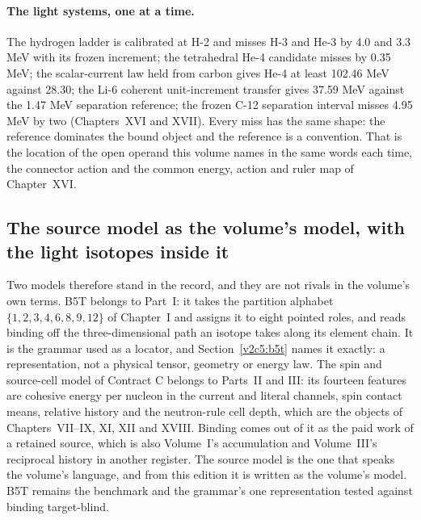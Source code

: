 \paragraph{The light systems, one at a time.} The hydrogen ladder is calibrated at H-2 and misses H-3 and He-3 by 4.0 and 3.3 MeV with its frozen increment; the tetrahedral He-4 candidate misses by 0.35 MeV; the scalar-current law held from carbon gives He-4 at least 102.46 MeV against 28.30; the Li-6 coherent unit-increment transfer gives 37.59 MeV against the 1.47 MeV separation reference; the frozen C-12 separation interval misses 4.95 MeV by two (Chapters~XVI and XVII). Every miss has the same shape: the reference dominates the bound object and the reference is a convention. That is the location of the open operand this volume names in the same words each time, the connector action and the common energy, action and ruler map of Chapter~XVI.

\subsection{The source model as the volume's model, with the light isotopes inside it}
\label{v2c5:sourcemodel}

Two models therefore stand in the record, and they are not rivals in the volume's own terms. B5T belongs to Part~I: it takes the partition alphabet $\{1,2,3,4,6,8,9,12\}$ of Chapter~I and assigns it to eight pointed roles, and reads binding off the three-dimensional path an isotope takes along its element chain. It is the grammar used as a locator, and Section~\ref{v2c5:b5t} names it exactly: a representation, not a physical tensor, geometry or energy law. The spin and source-cell model of Contract C belongs to Parts~II and III: its fourteen features are cohesive energy per nucleon in the current and literal channels, spin contact means, relative history and the neutron-rule cell depth, which are the objects of Chapters~VII--IX, XI, XII and XVIII. Binding comes out of it as the paid work of a retained source, which is also Volume~I's accumulation and Volume~III's reciprocal history in another register. The source model is the one that speaks the volume's language, and from this edition it is written as the volume's model. B5T remains the benchmark and the grammar's one representation tested against binding target-blind.

